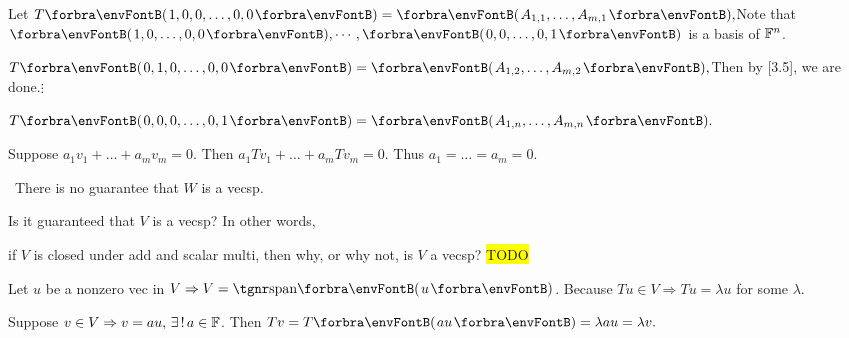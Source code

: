\documentclass[a4paper, 11pt, UTF8]{article}
\begin{document}
\begin{large}
\par\quad
Let $T\Par{1,0,0,\dots,0,0}=\Par{A_{1,1},\dots,A_{m,1}},$\quad Note that $\Par{1,0,\dots,0,0},\cdots,\Par{0,0,\dots,0,1}$ is a basis of ${\mathbb{F}}^n$.\par\quad
{}$T\Par{0,1,0,\dots,0,0}=\Par{A_{1,2},\dots,A_{m,2}},$\quad Then by [3.5], we are done.\PfEnd{}$\vdots$\par\quad
{}$T\Par{0,0,0,\dots,0,1}=\Par{A_{1,n},\dots,A_{m,n}}.$\par
\SepLine

Suppose $a_1 v_1+\dots+a_m v_m=0$. Then $a_1 Tv_1+\dots+a_m Tv_m=0$. Thus $a_1=\dots=a_m=0.$\PfEnd
\SepLine

\par
\Comment \,\,\,There is no guarantee that $W$ is a vecsp. \par
\Blind{\Comment\,\,\,}Is it guaranteed that $V$ is a vecsp? In other words,\par
\Blind{\Comment\,\,\,}if $V$ is closed under add and scalar multi, then why, or why not, is $V$ a vecsp? \colorbox{yellow}{TODO}\par
\SepLine

Let $u$ be a nonzero vec in $V\Rightarrow V=\Span{u}$. Because $Tu\in V\Rightarrow Tu=\lambda u$ for some $\lambda$.\par
\Blind{\Solution}Suppose $v\in V\Rightarrow v=au,\,\exists\,!\,a\in{\mathbb{F}}$. Then $Tv=T\Par{au}=\lambda au=\lambda v.$\PfEnd
\SepLine


\end{large}
\end{document}

